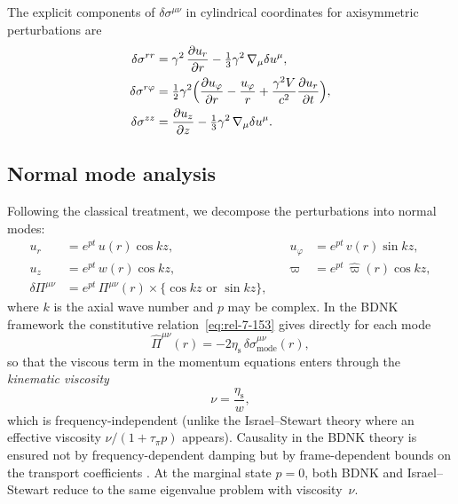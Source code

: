 The explicit components of $\delta\sigma^{\mu\nu}$ in cylindrical
coordinates for axisymmetric perturbations are
\begin{align}
\label{eq:rel-7-154}
\delta\sigma^{rr} &= \gamma^{2}\,\frac{\partial u_{r}}{\partial r}
  - \tfrac{1}{3}\gamma^{2}\,\nabla_{\mu}\delta u^{\mu},
\\
\delta\sigma^{r\varphi} &= \tfrac{1}{2}\gamma^{2}
  \Bigl(\frac{\partial u_{\varphi}}{\partial r}
  - \frac{u_{\varphi}}{r}
  + \frac{\gamma^{2}V}{c^{2}}\frac{\partial u_{r}}{\partial t}\Bigr),
\\
\delta\sigma^{zz} &= \frac{\partial u_{z}}{\partial z}
  - \tfrac{1}{3}\gamma^{2}\,\nabla_{\mu}\delta u^{\mu}.
\end{align}

\subsection{Normal mode analysis}\label{sec:rel-7-70c}

Following the classical treatment, we decompose the perturbations
into normal modes:
\begin{equation}
\label{eq:rel-7-155}
\begin{aligned}
u_{r} &= e^{pt}\,u(r)\cos kz, &\quad
u_{\varphi} &= e^{pt}\,v(r)\sin kz, \\
u_{z} &= e^{pt}\,w(r)\cos kz, &\quad
\varpi &= e^{pt}\,\hat\varpi(r)\cos kz, \\
\delta\Pi^{\mu\nu} &= e^{pt}\,\Pi^{\mu\nu}(r)
  \times\{\cos kz \text{ or } \sin kz\},
\end{aligned}
\end{equation}
where $k$ is the axial wave number and $p$ may be complex.  In the
BDNK framework the constitutive relation~\eqref{eq:rel-7-153}
gives directly for each mode
\begin{equation}
\label{eq:rel-7-156}
\hat{\Pi}^{\mu\nu}(r)
  = -2\eta_{\mathrm{s}}\,
    \delta\sigma^{\mu\nu}_{\mathrm{mode}}(r),
\end{equation}
so that the viscous term in the momentum equations enters through the
\emph{kinematic viscosity}
\begin{equation}
\label{eq:rel-7-157}
\nu = \frac{\eta_{\mathrm{s}}}{w},
\end{equation}
which is frequency-independent (unlike the Israel--Stewart theory
where an effective viscosity $\nu/(1+\tau_{\pi}p)$ appears).
Causality in the BDNK theory is ensured not by frequency-dependent
damping but by frame-dependent bounds on the transport coefficients
\citep{Kovtun2019,HoultKovtun2020}.  At the marginal state $p=0$,
both BDNK and Israel--Stewart reduce to the same eigenvalue problem
with viscosity~$\nu$.


